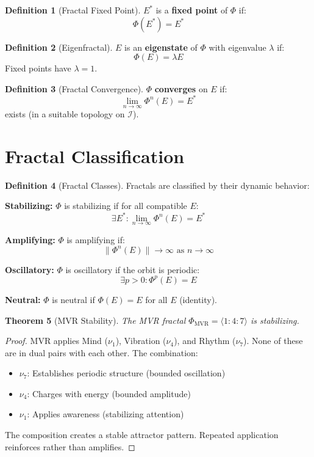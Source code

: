 \documentclass[11pt,twoside,openright]{book}
\theoremstyle{definition}
\newtheorem{definition}{Definition}[chapter]
\theoremstyle{plain}
\newtheorem{theorem}[definition]{Theorem}
\theoremstyle{remark}
\newcommand{\Ideas}{\mathcal{I}}
\newcommand{\noe}[1]{\nu_{#1}}
\newcommand{\Frac}{\Phi}
\begin{document}
\begin{definition}[Fractal Fixed Point]
\label{def:fractal-fixpoint}
$E^*$ is a \textbf{fixed point} of $\Frac$ if:
\[
\Frac(E^*) = E^*
\]
\end{definition}

\begin{definition}[Eigenfractal]
\label{def:eigenfractal}
$E$ is an \textbf{eigenstate} of $\Frac$ with eigenvalue $\lambda$ if:
\[
\Frac(E) = \lambda E
\]
Fixed points have $\lambda = 1$.
\end{definition}

\begin{definition}[Fractal Convergence]
\label{def:fractal-convergence}
$\Frac$ \textbf{converges} on $E$ if:
\[
\lim_{n \to \infty} \Frac^n(E) = E^*
\]
exists (in a suitable topology on $\Ideas$).
\end{definition}

\section{Fractal Classification}

\begin{definition}[Fractal Classes]
\label{def:fractal-classes}
Fractals are classified by their dynamic behavior:

\textbf{Stabilizing:} $\Frac$ is stabilizing if for all compatible $E$:
\[
\exists E^* : \lim_{n \to \infty} \Frac^n(E) = E^*
\]

\textbf{Amplifying:} $\Frac$ is amplifying if:
\[
\|\Frac^n(E)\| \to \infty \text{ as } n \to \infty
\]

\textbf{Oscillatory:} $\Frac$ is oscillatory if the orbit is periodic:
\[
\exists p > 0 : \Frac^p(E) = E
\]

\textbf{Neutral:} $\Frac$ is neutral if $\Frac(E) = E$ for all $E$ (identity).
\end{definition}

\begin{theorem}[MVR Stability]
\label{thm:mvr-stability}
The MVR fractal $\Frac_{\text{MVR}} = \langle 1 : 4 : 7 \rangle$ is stabilizing.
\end{theorem}

\begin{proof}
MVR applies Mind ($\noe{1}$), Vibration ($\noe{4}$), and Rhythm ($\noe{7}$). None of these are in dual pairs with each other. The combination:
\begin{itemize}
\item $\noe{7}$: Establishes periodic structure (bounded oscillation)
\item $\noe{4}$: Charges with energy (bounded amplitude)
\item $\noe{1}$: Applies awareness (stabilizing attention)
\end{itemize}
The composition creates a stable attractor pattern. Repeated application reinforces rather than amplifies.
\end{proof}
\end{document}
